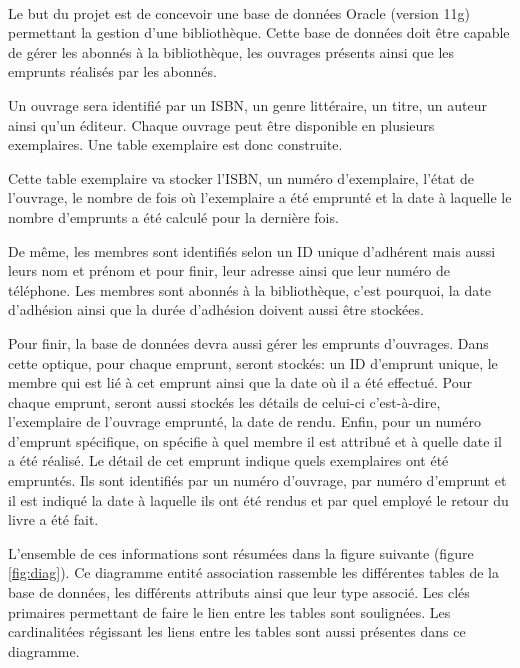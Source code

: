 \documentclass[11pt,a4paper]{article}
\begin{document}
    \paragraph{}
    Le but du projet est de concevoir une base de données Oracle (version 11g) permettant la gestion d'une bibliothèque. Cette base de données doit être capable de gérer les abonnés à la bibliothèque, les ouvrages présents ainsi que les emprunts réalisés par les abonnés.
    \par
    Un ouvrage sera identifié par un ISBN, un genre littéraire, un titre, un auteur ainsi qu'un éditeur. Chaque ouvrage peut être disponible en plusieurs exemplaires. Une table exemplaire est donc construite.
    \par
    Cette table exemplaire va stocker l'ISBN, un numéro d'exemplaire, l'état de l'ouvrage, le nombre de fois où l'exemplaire a été emprunté et la date à laquelle le nombre d'emprunts a été calculé pour la dernière fois.
    \par
    De même, les membres sont identifiés selon un ID unique d'adhérent mais aussi leurs nom et prénom et pour finir, leur adresse ainsi que leur numéro de téléphone. Les membres sont abonnés à la bibliothèque, c'est pourquoi, la date d'adhésion ainsi que la durée d'adhésion doivent aussi être stockées.
    \par
    Pour finir, la base de données devra aussi gérer les emprunts d'ouvrages. Dans cette optique, pour chaque emprunt, seront stockés: un ID d'emprunt unique, le membre qui est lié à cet emprunt ainsi que la date où il a été effectué. Pour chaque emprunt, seront aussi stockés les détails de celui-ci c'est-à-dire, l'exemplaire de l'ouvrage emprunté, la date de rendu. 
    Enfin, pour un numéro d'emprunt spécifique, on spécifie à quel membre il est attribué et à quelle date il a été réalisé. Le détail de cet emprunt indique quels exemplaires ont été empruntés. Ils sont identifiés par un numéro d'ouvrage, par numéro d'emprunt et il est indiqué la date à laquelle ils ont été rendus et par quel employé le retour du livre a été fait.\\
    \par
    L'ensemble de ces informations sont résumées dans la figure suivante (figure \ref{fig:diag}). Ce diagramme entité association rassemble les différentes tables de la base de données, les différents attributs ainsi que leur type associé. Les clés primaires permettant de faire le lien entre les tables sont soulignées. Les cardinalitées régissant les liens entre les tables sont aussi présentes dans ce diagramme.
\end{document}
